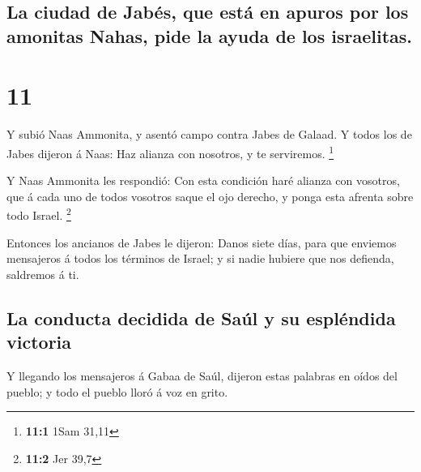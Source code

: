 \hypertarget{la-ciudad-de-jabuxe9s-que-estuxe1-en-apuros-por-los-amonitas-nahas-pide-la-ayuda-de-los-israelitas.}{%
\subsection{La ciudad de Jabés, que está en apuros por los amonitas
Nahas, pide la ayuda de los
israelitas.}\label{la-ciudad-de-jabuxe9s-que-estuxe1-en-apuros-por-los-amonitas-nahas-pide-la-ayuda-de-los-israelitas.}}

\hypertarget{section-10}{%
\section{11}\label{section-10}}

 Y subió Naas Ammonita, y asentó campo contra Jabes de
Galaad. Y todos los de Jabes dijeron á Naas: Haz alianza con nosotros, y
te serviremos. \footnote{\textbf{11:1} 1Sam 31,11}

 Y Naas Ammonita les respondió: Con esta condición haré
alianza con vosotros, que á cada uno de todos vosotros saque el ojo
derecho, y ponga esta afrenta sobre todo Israel. \footnote{\textbf{11:2}
  Jer 39,7}

 Entonces los ancianos de Jabes le dijeron: Danos siete
días, para que enviemos mensajeros á todos los términos de Israel; y si
nadie hubiere que nos defienda, saldremos á ti.

\hypertarget{la-conducta-decidida-de-sauxfal-y-su-espluxe9ndida-victoria}{%
\subsection{La conducta decidida de Saúl y su espléndida
victoria}\label{la-conducta-decidida-de-sauxfal-y-su-espluxe9ndida-victoria}}

 Y llegando los mensajeros á Gabaa de Saúl, dijeron estas
palabras en oídos del pueblo; y todo el pueblo lloró á voz en grito.


